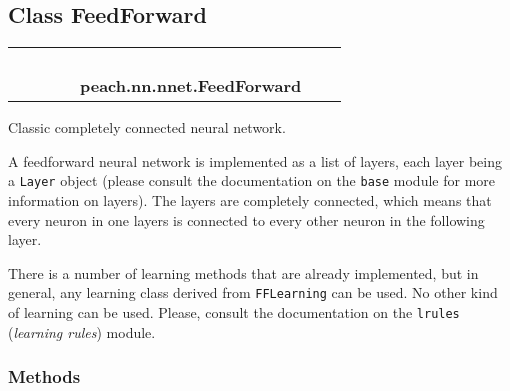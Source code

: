 
\subsection{Class FeedForward}

    \label{peach:nn:nnet:FeedForward}
\begin{tabular}{cccccccc}
\multicolumn{2}{r}{\settowidth{\BCL}{object}\multirow{2}{\BCL}{object}}
&&
&&
  \\\cline{3-3}
  &&\multicolumn{1}{c|}{}
&&
&&
  \\
\multicolumn{4}{r}{\settowidth{\BCL}{list}\multirow{2}{\BCL}{list}}
&&
  \\\cline{5-5}
  &&&&\multicolumn{1}{c|}{}
&&
  \\
&&&&\multicolumn{2}{l}{\textbf{peach.nn.nnet.FeedForward}}
\end{tabular}


Classic completely connected neural network.

A feedforward neural network is implemented as a list of layers, each layer
being a \texttt{Layer} object (please consult the documentation on the \texttt{base}
module for more information on layers). The layers are completely connected,
which means that every neuron in one layers is connected to every other
neuron in the following layer.

There is a number of learning methods that are already implemented, but in
general, any learning class derived from \texttt{FFLearning} can be used. No
other kind of learning can be used. Please, consult the documentation on the
\texttt{lrules} (\emph{learning rules}) module.


  \subsubsection{Methods}

